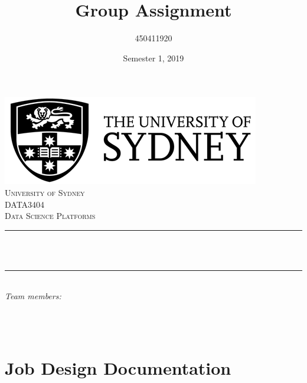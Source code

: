 \documentclass[12pt]{article}
\title{Group Assignment}								%
\author{
	450411920 \\
}								%
\date{Semester 1, 2019}											%
\makeatletter
\let\thetitle\@title
\let\theauthor\@author
\let\thedate\@date
\makeatother
\begin{document}

\begin{titlepage}
	\centering
    \vspace*{0.5 cm}
    \includegraphics[scale = 0.75]{USYD_LOGO_New.jpg}\\[1.0 cm]	%
    \textsc{\LARGE University of Sydney}\\[2.0 cm]	%
	\textsc{\Large DATA3404}\\[0.5 cm]				%
	\textsc{\large Data Science Platforms}\\[0.5 cm]				%
	\rule{\linewidth}{0.2 mm} \\[0.4 cm]
	{ \huge \bfseries \thetitle}\\
	\rule{\linewidth}{0.2 mm} \\[1.5 cm]
	
	
		
	\emph{Team members:}\\
	\theauthor
		
	\begin{minipage}{0.45\textwidth}
			
	\end{minipage}\\[2 cm]
	
	{\large \thedate}\\[2 cm]
 
	\vfill
	
\end{titlepage}


\tableofcontents
\pagebreak


{}
\section*{Job Design Documentation}
\end{document}
